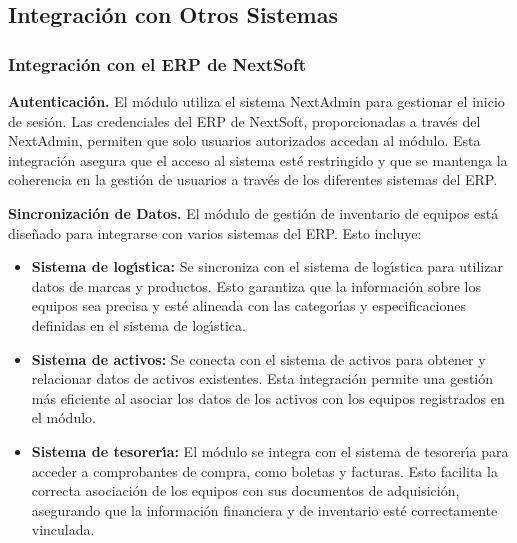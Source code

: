 \documentclass[stu, 12pt, letterpaper, donotrepeattitle, floatsintext, natbib]{apa7}
\begin{document}
\subsection{Integraci\'on con Otros Sistemas}
\subsubsection{Integraci\'on con el ERP de NextSoft}
\textbf{Autenticaci\'on. }El m\'odulo utiliza el sistema NextAdmin para gestionar el inicio de sesi\'on. Las credenciales del ERP de NextSoft, proporcionadas a trav\'es del NextAdmin, permiten que solo usuarios autorizados accedan al m\'odulo. Esta integraci\'on asegura que el acceso al sistema est\'e restringido y que se mantenga la coherencia en la gesti\'on de usuarios a trav\'es de los diferentes sistemas del ERP.

\textbf{Sincronizaci\'on de Datos. }El m\'odulo de gesti\'on de inventario de equipos est\'a dise\~{n}ado para integrarse con varios sistemas del ERP. Esto incluye:
\begin{itemize}
    \item\textbf{Sistema de log\'{\i}stica: }Se sincroniza con el sistema de log\'{\i}stica para utilizar datos de marcas y productos. Esto garantiza que la informaci\'on sobre los equipos sea precisa y est\'e alineada con las categor\'{\i}as y especificaciones definidas en el sistema de log\'{\i}stica.
    \item\textbf{Sistema de activos: }Se conecta con el sistema de activos para obtener y relacionar datos de activos existentes. Esta integraci\'on permite una gesti\'on m\'as eficiente al asociar los datos de los activos con los equipos registrados en el m\'odulo.
    \item\textbf{Sistema de tesorer\'{\i}a: }El m\'odulo se integra con el sistema de tesorer\'{\i}a para acceder a comprobantes de compra, como boletas y facturas. Esto facilita la correcta asociaci\'on de los equipos con sus documentos de adquisici\'on, asegurando que la informaci\'on financiera y de inventario est\'e correctamente vinculada.
\end{itemize}
\end{document}
